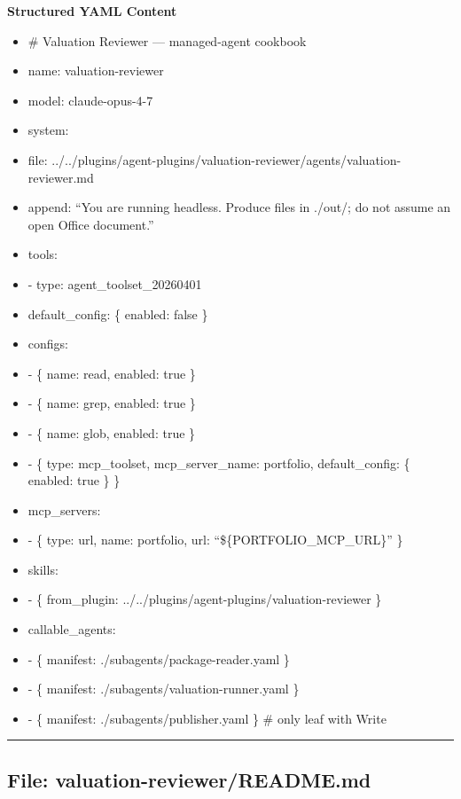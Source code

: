 \documentclass[11pt]{article}
\begin{document}
\textbf{Structured YAML Content}
\begin{itemize}[leftmargin=*,itemsep=2pt,topsep=2pt]
\item {} \# Valuation Reviewer — managed-agent cookbook
\item {} name: valuation-reviewer
\item {} model: claude-opus-4-7
\item {} system:
\item {} file: ../../plugins/agent-plugins/valuation-reviewer/agents/valuation-reviewer.md
\item {} append: ``You are running headless. Produce files in ./out/; do not assume an open Office document.''
\item {} tools:
\item {} - type: agent\_\allowbreak{}toolset\_\allowbreak{}20260401
\item {} default\_\allowbreak{}config: \{ enabled: false \}
\item {} configs:
\item {} - \{ name: read, enabled: true \}
\item {} - \{ name: grep, enabled: true \}
\item {} - \{ name: glob, enabled: true \}
\item {} - \{ type: mcp\_\allowbreak{}toolset, mcp\_\allowbreak{}server\_\allowbreak{}name: portfolio, default\_\allowbreak{}config: \{ enabled: true \} \}
\item {} mcp\_\allowbreak{}servers:
\item {} - \{ type: url, name: portfolio, url: ``\$\{PORTFOLIO\_\allowbreak{}MCP\_\allowbreak{}URL\}'' \}
\item {} skills:
\item {} - \{ from\_\allowbreak{}plugin: ../../plugins/agent-plugins/valuation-reviewer \}
\item {} callable\_\allowbreak{}agents:
\item {} - \{ manifest: ./subagents/package-reader.yaml \}
\item {} - \{ manifest: ./subagents/valuation-runner.yaml \}
\item {} - \{ manifest: ./subagents/publisher.yaml \} \# only leaf with Write
\end{itemize}

\vspace{0.8em}\hrule\vspace{0.8em}

\subsection{File: valuation-reviewer/README.md}\label{file:valuation-reviewer-README-md}
\end{document}

